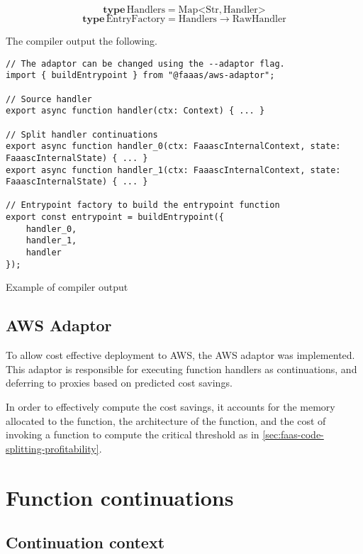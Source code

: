 \begin{signature}
$$\textbf{type}\, \textrm{Handlers} = \textrm{Map}\mathord{<}\textrm{Str}, \textrm{Handler}\mathord{>}$$
$$\textbf{type}\, \textrm{EntryFactory} = \textrm{Handlers} \rightarrow \textrm{RawHandler}$$
\end{signature}

The \faaasc{} compiler output the following.

\begin{listing}[H]
\begin{verbatim}
// The adaptor can be changed using the --adaptor flag.
import { buildEntrypoint } from "@faaas/aws-adaptor";

// Source handler
export async function handler(ctx: Context) { ... }

// Split handler continuations
export async function handler_0(ctx: FaaascInternalContext, state: FaaascInternalState) { ... }
export async function handler_1(ctx: FaaascInternalContext, state: FaaascInternalState) { ... }

// Entrypoint factory to build the entrypoint function
export const entrypoint = buildEntrypoint({
    handler_0,
    handler_1,
    handler
});
\end{verbatim}
\caption{Example of \faaasc{} compiler output}
\label{listing:faaasc-compiler-adaptor-output}
\end{listing}

\subsection{AWS Adaptor}
To allow cost effective deployment to AWS, the \faaasc{} AWS adaptor was implemented. This adaptor is responsible for executing function handlers as continuations, and deferring to proxies based on predicted cost savings.

In order to effectively compute the cost savings, it accounts for the memory allocated to the function, the architecture of the function, and the cost of invoking a function to compute the critical threshold as in \ref{sec:faas-code-splitting-profitability}.

\section{Function continuations}

\subsection{Continuation context}

